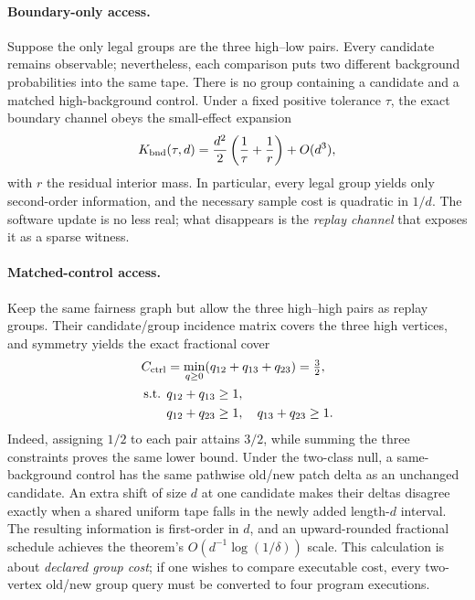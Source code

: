 \paragraph{Boundary-only access.} Suppose the only legal groups are the three high--low pairs. Every candidate remains observable; nevertheless, each comparison puts two different background probabilities into the same tape. There is no group containing a candidate and a matched high-background control. Under a fixed positive tolerance $\tau$, the exact boundary channel obeys the small-effect expansion
\begin{equation}\label{eq:bnd-expansion}
K_{\rm bnd}(\tau,d)=\frac{d^2}{2}\left(\frac1\tau+\frac1r\right)+O(d^3),
\end{equation}
with $r$ the residual interior mass. In particular, every legal group yields only second-order information, and the necessary sample cost is quadratic in $1/d$. The software update is no less real; what disappears is the \emph{replay channel} that exposes it as a sparse witness.

\paragraph{Matched-control access.} Keep the same fairness graph but allow the three high--high pairs as replay groups. Their candidate/group incidence matrix covers the three high vertices, and symmetry yields the exact fractional cover
\begin{equation}\label{eq:triangle-cover}
\begin{aligned}
C_{\rm ctrl}&=\min_{q\ge0}(q_{12}+q_{13}+q_{23})=\tfrac32,\\
\text{s.t. }&q_{12}+q_{13}\ge1,\\
&q_{12}+q_{23}\ge1,\quad q_{13}+q_{23}\ge1.
\end{aligned}
\end{equation}
Indeed, assigning $1/2$ to each pair attains $3/2$, while summing the three constraints proves the same lower bound. Under the two-class null, a same-background control has the same pathwise old/new patch delta as an unchanged candidate. An extra shift of size $d$ at one candidate makes their deltas disagree exactly when a shared uniform tape falls in the newly added length-$d$ interval. The resulting information is first-order in $d$, and an upward-rounded fractional schedule achieves the theorem's $O(d^{-1}\log(1/\delta))$ scale. This calculation is about \emph{declared group cost}; if one wishes to compare executable cost, every two-vertex old/new group query must be converted to four program executions.

